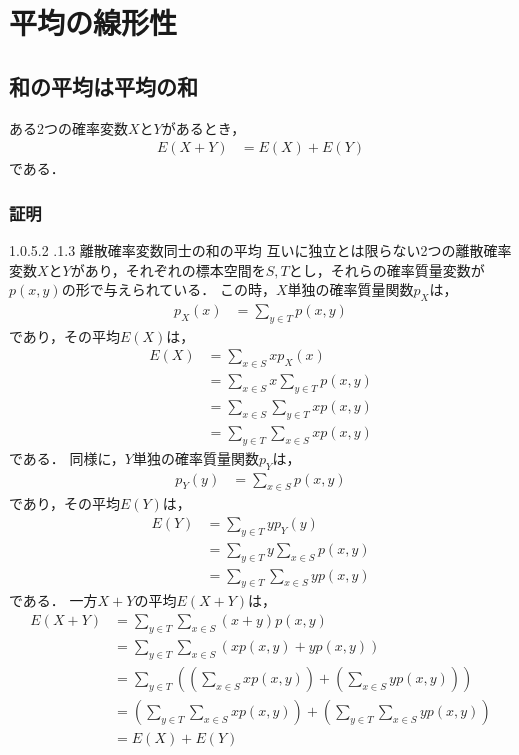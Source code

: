 \documentclass[dvipdfmx]{jsarticle}
\makeatletter
\newcommand{\subsubsubsection}{\@startsection{paragraph}{4}{\z@}%
 {1.0\Cvs \@plus.5\Cdp \@minus.2\Cdp}%
 {.1\Cvs \@plus.3\Cdp}%
 {\reset@font\sffamily\normalsize}
}
\makeatother
\begin{document}
 \section{平均の線形性}
 \subsection{和の平均は平均の和}
ある2つの確率変数$X$と$Y$があるとき，
 \begin{align}
  E\left(X+Y\right)&=E\left(X\right)+E\left(Y\right)
 \end{align}
である．
 \subsubsection{証明}
 \subsubsubsection{離散確率変数同士の和の平均}
互いに独立とは限らない2つの離散確率変数$X$と$Y$があり，それぞれの標本空間を$S,T$とし，それらの確率質量変数が$p\left(x,y\right)$の形で与えられている．
この時，$X$単独の確率質量関数$p_X$は，
 \begin{align}
  p_X\left(x\right)&=\sum_{y\in T}p\left(x,y\right)
 \end{align}
であり，その平均$E\left(X\right)$は，
 \begin{align}
  E\left(X\right)&=\sum_{x\in S}xp_X\left(x\right)\nonumber\\
  &=\sum_{x\in S}x\sum_{y\in T}p\left(x,y\right)\nonumber\\
  &=\sum_{x\in S}\sum_{y\in T}xp\left(x,y\right)\nonumber\\
  &=\sum_{y\in T}\sum_{x\in S}xp\left(x,y\right)
 \end{align}
である．
同様に，$Y$単独の確率質量関数$p_Y$は，
 \begin{align}
  p_Y\left(y\right)&=\sum_{x\in S}p\left(x,y\right)
 \end{align}
であり，その平均$E\left(Y\right)$は，
 \begin{align}
  E\left(Y\right)&=\sum_{y\in T}yp_Y\left(y\right)\nonumber\\
  &=\sum_{y\in T}y\sum_{x\in S}p\left(x,y\right)\nonumber\\
  &=\sum_{y\in T}\sum_{x\in S}yp\left(x,y\right)
 \end{align}
である．
一方$X+Y$の平均$E\left(X+Y\right)$は，
 \begin{align}
  E\left(X+Y\right)&=\sum_{y\in T}\sum_{x\in S}\left(x+y\right)p\left(x,y\right)\nonumber\\
  &=\sum_{y\in T}\sum_{x\in S}\left(xp\left(x,y\right)+yp\left(x,y\right)\right)\nonumber\\
  &=\sum_{y\in T}\left(\left(\sum_{x\in S}xp\left(x,y\right)\right)+\left(\sum_{x\in S}yp\left(x,y\right)\right)\right)\nonumber\\
  &=\left(\sum_{y\in T}\sum_{x\in S}xp\left(x,y\right)\right)+\left(\sum_{y\in T}\sum_{x\in S}yp\left(x,y\right)\right)\nonumber\\
  &=E\left(X\right)+E\left(Y\right)
 \end{align}
\end{document}
